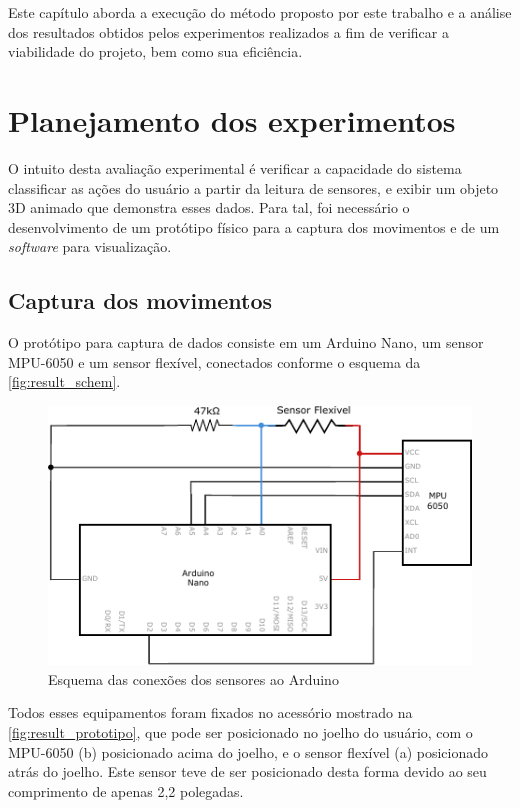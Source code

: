Este capítulo aborda a execução do método proposto por este trabalho e a análise dos resultados obtidos pelos experimentos realizados a fim de verificar a viabilidade do projeto, bem como sua eficiência.

\section{Planejamento dos experimentos}\label{sec:result_planejamento}
O intuito desta avaliação experimental é verificar a capacidade do sistema \theproduct{} classificar as ações do usuário a partir da leitura de sensores, e exibir um objeto 3D animado que demonstra esses dados. Para tal, foi necessário o desenvolvimento de um protótipo físico para a captura dos movimentos e de um \textit{software} para visualização.

\subsection{Captura dos movimentos}\label{sec:result_captura}
O protótipo para captura de dados consiste em um Arduino Nano, um sensor MPU-6050 e um sensor flexível, conectados conforme o esquema da \autoref{fig:result_schem}. 

\begin{figure}[ht]
	\caption{\label{fig:result_schem}Esquema das conexões dos sensores ao Arduino}
	\begin{center}
	    \includegraphics[width=.8\textwidth]{resources/result_schem}
	\end{center}
\end{figure}

Todos esses equipamentos foram fixados no acessório mostrado na \autoref{fig:result_prototipo}, que pode ser posicionado no joelho do usuário, com o MPU-6050 (b) posicionado acima do joelho, e o sensor flexível (a) posicionado atrás do joelho. Este sensor teve de ser posicionado desta forma devido ao seu comprimento de apenas 2,2 polegadas.

